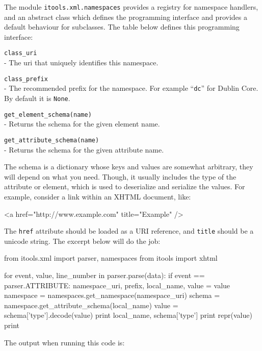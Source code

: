The module {\tt itools.xml.namespaces} provides a registry for namespace
handlers, and an abstract class which defines the programming interface
and provides a default behaviour for subclasses. The table below defines
this programming interface:

\begin{api}
    {\tt class\_uri}\\
    - The uri that uniquely identifies this namespace.

    {\tt class\_prefix}\\
    - The recommended prefix for the namespace. For example ``{\tt dc}''
      for Dublin Core. By default it is {\tt None}.

    {\tt get\_element\_schema(name)}\\
    - Returns the schema for the given element name.

    {\tt get\_attribute\_schema(name)}\\
    - Returns the schema for the given attribute name.
\end{api}

The schema is a dictionary whose keys and values are somewhat arbitrary,
they will depend on what you need. Though, it usually includes the type
of the attribute or element, which is used to deserialize and serialize
the values. For example, consider a link within an XHTML document, like:

\begin{code}
    <a href="http://www.example.com" title="Example" />
\end{code}

The {\tt href} attribute should be loaded as a URI reference, and {\tt title}
should be a unicode string. The excerpt below will do the job:

\begin{code}
    from itools.xml import parser, namespaces
    from itools import xhtml

    for event, value, line_number in parser.parse(data):
        if event == parser.ATTRIBUTE:
            namespace_uri, prefix, local_name, value = value
            namespace = namespaces.get_namespace(namespace_uri)
            schema = namespace.get_attribute_schema(local_name)
            value = schema['type'].decode(value)
            print local_name, schema['type']
            print repr(value)
            print
\end{code}

The output when running this code is:

